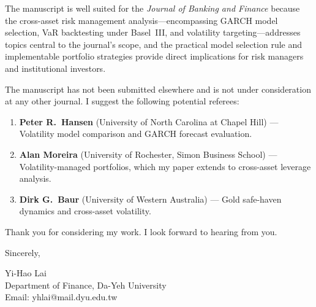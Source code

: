 \documentclass[11pt,a4paper]{article}
\begin{document}
The manuscript is well suited for the \textit{Journal of Banking and Finance} because the cross-asset risk management analysis---encompassing GARCH model selection, VaR backtesting under Basel~III, and volatility targeting---addresses topics central to the journal's scope, and the practical model selection rule and implementable portfolio strategies provide direct implications for risk managers and institutional investors.

The manuscript has not been submitted elsewhere and is not under consideration at any other journal. I suggest the following potential referees:

\begin{enumerate}[nosep]
\item \textbf{Peter R.\ Hansen} (University of North Carolina at Chapel Hill) --- Volatility model comparison and GARCH forecast evaluation.
\item \textbf{Alan Moreira} (University of Rochester, Simon Business School) --- Volatility-managed portfolios, which my paper extends to cross-asset leverage analysis.
\item \textbf{Dirk G.\ Baur} (University of Western Australia) --- Gold safe-haven dynamics and cross-asset volatility.
\end{enumerate}

\noindent Thank you for considering my work. I look forward to hearing from you.

\bigskip

\noindent
Sincerely,

\bigskip

\noindent
Yi-Hao Lai\\
Department of Finance, Da-Yeh University\\
Email: yhlai@mail.dyu.edu.tw
\end{document}
